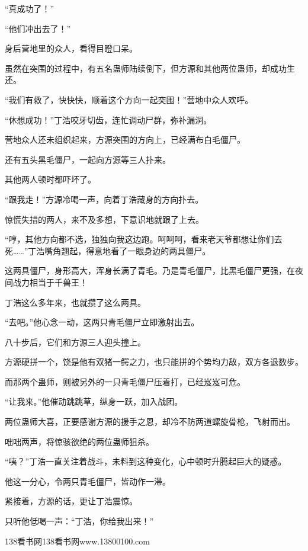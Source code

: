 \begin{this_body}
“真成功了！”

“他们冲出去了！”

身后营地里的众人，看得目瞪口呆。

虽然在突围的过程中，有五名蛊师陆续倒下，但方源和其他两位蛊师，却成功生还。

“我们有救了，快快快，顺着这个方向一起突围！”营地中众人欢呼。

“休想成功！”丁浩咬牙切齿，连忙调动尸群，弥补漏洞。

营地众人还未组织起来，方源突围的方向上，已经满布白毛僵尸。

还有五头黑毛僵尸，一起向方源等三人扑来。

其他两人顿时都吓坏了。

“跟我走！”方源冷喝一声，向着丁浩藏身的方向扑去。

惊慌失措的两人，来不及多想，下意识地就跟了上去。

“哼，其他方向都不选，独独向我这边跑。呵呵呵，看来老天爷都想让你们去死……”丁浩嘴角翘起，得意地看了一眼身边的两具僵尸。

这两具僵尸，身形高大，浑身长满了青毛。乃是青毛僵尸，比黑毛僵尸更强，在夜间战力相当于千兽王！

丁浩这么多年来，也就攒了这么两具。

“去吧。”他心念一动，这两只青毛僵尸立即激射出去。

八十步后，它们和方源三人迎头撞上。

方源硬拼一个，饶是他有双猪一鳄之力，也只能拼的个势均力敌，双方各退数步。

而那两个蛊师，则被另外的一只青毛僵尸压着打，已经岌岌可危。

“让我来。”他催动跳跳草，纵身一跃，加入战团。

两位蛊师大喜，正要感谢方源的援手之恩，却冷不防两道螺旋骨枪，飞射而出。

咄咄两声，将惊骇欲绝的两位蛊师狙杀。

“咦？”丁浩一直关注着战斗，未料到这种变化，心中顿时升腾起巨大的疑惑。

他这一分心，令两只青毛僵尸，皆动作一滞。

紧接着，方源的话，更让丁浩震惊。

只听他低喝一声：“丁浩，你给我出来！”

138看书网138看书网www.13800100.com

\end{this_body}


